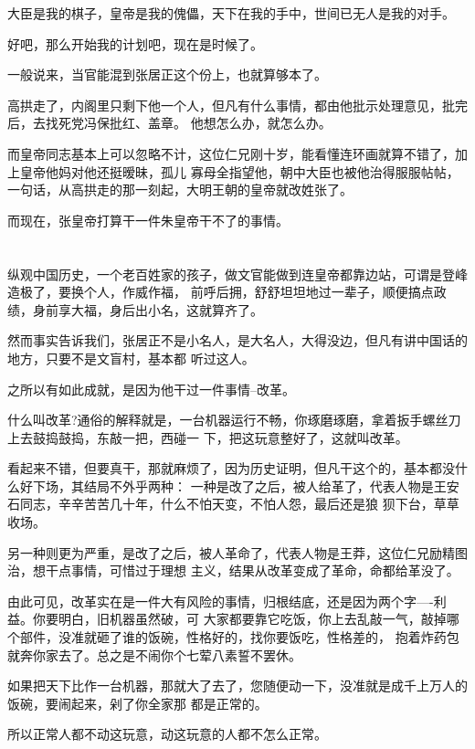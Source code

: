 \documentclass[11pt,a4paper,onecolumn]{article}
\begin{document}
大臣是我的棋子，皇帝是我的傀儡，天下在我的手中，世间已无人是我的对手。

好吧，那么开始我的计划吧，现在是时候了。

一般说来，当官能混到张居正这个份上，也就算够本了。

高拱走了，内阁里只剩下他一个人，但凡有什么事情，都由他批示处理意见，批完后，去找死党冯保批红、盖章。
他想怎么办，就怎么办。

而皇帝同志基本上可以忽略不计，这位仁兄刚十岁，能看懂连环画就算不错了，加上皇帝他妈对他还挺暧昧，孤儿
寡母全指望他，朝中大臣也被他治得服服帖帖，一句话，从高拱走的那一刻起，大明王朝的皇帝就改姓张了。

而现在，张皇帝打算干一件朱皇帝干不了的事情。

\section[\thesection]{}

纵观中国历史，一个老百姓家的孩子，做文官能做到连皇帝都靠边站，可谓是登峰造极了，要换个人，作威作福，
前呼后拥，舒舒坦坦地过一辈子，顺便搞点政绩，身前享大福，身后出小名，这就算齐了。

然而事实告诉我们，张居正不是小名人，是大名人，大得没边，但凡有讲中国话的地方，只要不是文盲村，基本都
听过这人。

之所以有如此成就，是因为他干过一件事情--改革。

什么叫改革?通俗的解释就是，一台机器运行不畅，你琢磨琢磨，拿着扳手螺丝刀上去鼓捣鼓捣，东敲一把，西碰一
下，把这玩意整好了，这就叫改革。

看起来不错，但要真干，那就麻烦了，因为历史证明，但凡干这个的，基本都没什么好下场，其结局不外乎两种：
一种是改了之后，被人给革了，代表人物是王安石同志，辛辛苦苦几十年，什么不怕天变，不怕人怨，最后还是狼
狈下台，草草收场。

另一种则更为严重，是改了之后，被人革命了，代表人物是王莽，这位仁兄励精图治，想干点事情，可惜过于理想
主义，结果从改革变成了革命，命都给革没了。

由此可见，改革实在是一件大有风险的事情，归根结底，还是因为两个字----利益。你要明白，旧机器虽然破，可
大家都要靠它吃饭，你上去乱敲一气，敲掉哪个部件，没准就砸了谁的饭碗，性格好的，找你要饭吃，性格差的，
抱着炸药包就奔你家去了。总之是不闹你个七荤八素誓不罢休。

如果把天下比作一台机器，那就大了去了，您随便动一下，没准就是成千上万人的饭碗，要闹起来，剁了你全家那
都是正常的。

所以正常人都不动这玩意，动这玩意的人都不怎么正常。
\end{document}
